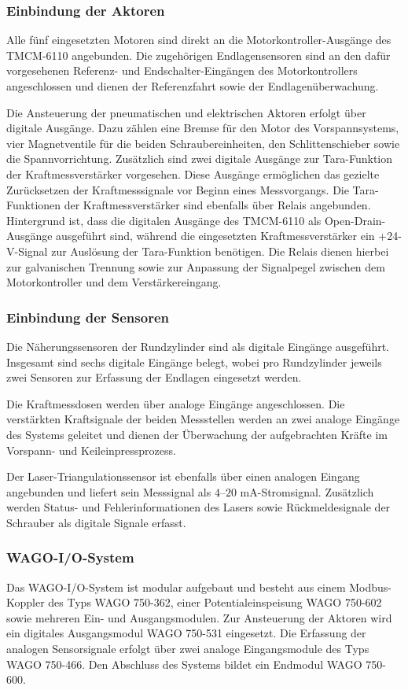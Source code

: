 \subsubsection{Einbindung der Aktoren}
Alle fünf eingesetzten Motoren sind direkt an die Motorkontroller-Ausgänge des TMCM-6110 angebunden. Die zugehörigen Endlagensensoren sind an den dafür vorgesehenen Referenz- und Endschalter-Eingängen des Motorkontrollers angeschlossen und dienen der Referenzfahrt sowie der Endlagenüberwachung.

Die Ansteuerung der pneumatischen und elektrischen Aktoren erfolgt über digitale Ausgänge. Dazu zählen eine Bremse für den Motor des Vorspannsystems, vier Magnetventile für die beiden Schraubereinheiten, den Schlittenschieber sowie die Spannvorrichtung. Zusätzlich sind zwei digitale Ausgänge zur Tara-Funktion der Kraftmessverstärker vorgesehen. Diese Ausgänge ermöglichen das gezielte Zurücksetzen der Kraftmesssignale vor Beginn eines Messvorgangs. Die Tara-Funktionen der Kraftmessverstärker sind ebenfalls über Relais angebunden. Hintergrund ist, dass die digitalen Ausgänge des TMCM-6110 als Open-Drain-Ausgänge ausgeführt sind, während die eingesetzten Kraftmessverstärker ein +24-V-Signal zur Auslösung der Tara-Funktion benötigen. Die Relais dienen hierbei zur galvanischen Trennung sowie zur Anpassung der Signalpegel zwischen dem Motorkontroller und dem Verstärkereingang.\cite{man_trinamic_tmcm6110}

\subsubsection{Einbindung der Sensoren}
Die Näherungssensoren der Rundzylinder sind als digitale Eingänge ausgeführt. Insgesamt sind sechs digitale Eingänge belegt, wobei pro Rundzylinder jeweils zwei Sensoren zur Erfassung der Endlagen eingesetzt werden.

Die Kraftmessdosen werden über analoge Eingänge angeschlossen. Die verstärkten Kraftsignale der beiden Messstellen werden an zwei analoge Eingänge des Systems geleitet und dienen der Überwachung der aufgebrachten Kräfte im Vorspann- und Keileinpressprozess.

Der Laser-Triangulationssensor ist ebenfalls über einen analogen Eingang angebunden und liefert sein Messsignal als $4\text{--}20\text{ mA}$-Stromsignal. Zusätzlich werden Status- und Fehlerinformationen des Lasers sowie Rückmeldesignale der Schrauber als digitale Signale erfasst.

\subsubsection{WAGO-I/O-System}
Das WAGO-I/O-System ist modular aufgebaut und besteht aus einem Modbus-Koppler des Typs WAGO 750-362, einer Potentialeinspeisung WAGO 750-602 sowie mehreren Ein- und Ausgangsmodulen. Zur Ansteuerung der Aktoren wird ein digitales Ausgangsmodul WAGO 750-531 eingesetzt. Die Erfassung der analogen Sensorsignale erfolgt über zwei analoge Eingangsmodule des Typs WAGO 750-466. Den Abschluss des Systems bildet ein Endmodul WAGO 750-600.\cite{ds_wago_750362, ds_wago_750602, ds_wago_750531, ds_wago_750466, ds_wago_750600}

